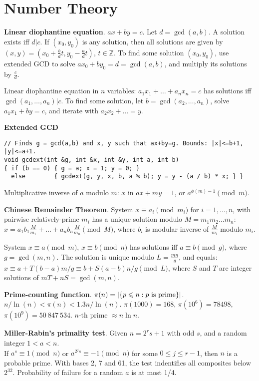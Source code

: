 \documentclass[a4paper, 12pt]{article}
\let\le=\leqslant
\newcommand{\Section}[1]{
  \section*{#1}
  \addcontentsline{toc}{subsection}{#1}
  \vspace{-3mm}
}
\newcommand{\Topic}[1]{\textbf{#1}}
\begin{document}
\Section{Number Theory}

\Topic{Linear diophantine equation}. $ax+by=c$.
Let $d=\gcd(a,b)$. A solution exists iff $d|c$.
If $(x_0,y_0)$ is any solution, then all solutions are given by
$(x,y) = (x_0 + \frac{b}{d}t, y_0 - \frac{a}{d}t)$, $t \in {\mathbb Z}$.
To find some solution $(x_0, y_0)$, use extended GCD to solve
$ax_0 + by_0 = d = \gcd(a, b)$, and multiply its solutions by $\frac{c}{d}$.

Linear diophantine equation in $n$ variables:
$a_1 x_1 + \dots + a_n x_n = c$ has solutions iff $\gcd(a_1, \dots, a_n) | c$.
To find some solution, let $b=\gcd(a_2, \dots, a_n)$,
solve $a_1 x_1 + by = c$, and iterate with $a_2 x_2 + \dots = y$.

\Topic{Extended GCD}
\vspace{-5mm}
\begin{verbatim}
// Finds g = gcd(a,b) and x, y such that ax+by=g. Bounds: |x|<=b+1, |y|<=a+1.
void gcdext(int &g, int &x, int &y, int a, int b)
{ if (b == 0) { g = a; x = 1; y = 0; }
  else        { gcdext(g, y, x, b, a % b); y = y - (a / b) * x; } }
\end{verbatim}
\vspace{-3mm}

Multiplicative inverse of $a$ modulo $m$:
$x$ in $ax + my = 1$, or $a^{\phi(m)-1} \pmod{m}$.

\Topic{Chinese Remainder Theorem}.
System $x \equiv a_i \pmod{m_i}$ for $i=1,\dots,n$, with
pairwise relatively-prime $m_i$ has a unique solution modulo $M = m_1 m_2 \dots m_n$:
$x = a_1 b_1 \frac{M}{m_1} + \dots + a_n b_n \frac{M}{m_n} \pmod{M}$,
where $b_i$ is modular inverse of $\frac{M}{m_i}$ modulo $m_i$.

System $x \equiv a \pmod{m}$, $x \equiv b \pmod{n}$ has solutions
iff $a \equiv b \pmod{g}$, where $g=\gcd(m,n)$.
The solution is unique modulo $L=\frac{mn}{g}$, and equals:
$x \equiv a + T(b-a) m/g \equiv b + S(a-b) n/g \pmod{L}$,
where $S$ and $T$ are integer solutions of $mT + nS = \gcd(m,n)$.

\Topic{Prime-counting function}. $\pi(n) = |\{p \le n : p \hbox{ is prime}\}|$.
$n/\ln(n) < \pi(n) < 1.3 n/\ln(n)$. 
$\pi(1000) = 168$, $\pi(10^6) = 78498$, $\pi(10^9) = 50\ 847\ 534$.
\quad $n$-th prime $\approx n \ln n$.

\Topic{Miller-Rabin's primality test}.
Given $n = 2^r s + 1$ with odd $s$, and a random integer $1 < a < n$. \\
If $a^s \equiv 1 {\pmod n}$ or $a^{2^j s} \equiv -1 {\pmod n}$ for some
$0 \le j \le r-1$, then $n$ is a probable prime.
With bases 2, 7 and 61, the test indentifies all composites below $2^{32}$.
Probability of failure for a random $a$ is at most 1/4.
\end{document}
